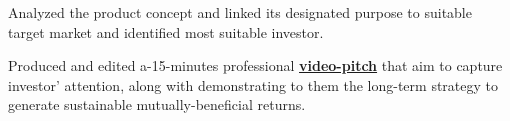 \documentclass[letterpaper]{deedy-resume} %
\begin{document}
\begin{minipage}[t]{0.66\textwidth}
\begin{tightitemize}
\item Analyzed the product concept and linked its designated purpose to suitable target market and identified most suitable investor.
\item Produced and edited a-15-minutes professional  \href{https://drive.google.com/file/d/0B7mZbJb-qiSUOGc5SlpLU3ZRMnc/view?usp=sharing}{\bf video-pitch} that aim to capture investor’ attention, along with demonstrating to them the long-term strategy to generate sustainable mutually-beneficial returns.
\end{tightitemize}
\sectionspace %
\end{minipage} %








\end{document}

